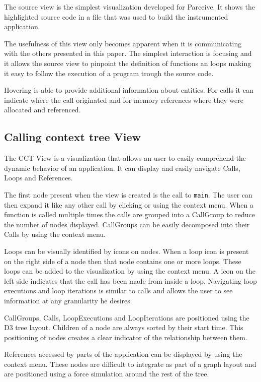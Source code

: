 \documentclass[conference]{IEEEtran}
\begin{document}
The source view is the simplest visualization developed for Parceive. It shows the highlighted source code in a file that was used to build the instrumented application.

The usefulness of this view only becomes apparent when it is communicating with the others presented in this paper. The simplest interaction is focusing and it allows the source view to pinpoint the definition of functions an loops making it easy to follow the execution of a program trough the source code.

Hovering is able to provide additional information about entities. For calls it can indicate where the call originated and for memory references where they were allocated and referenced.

\subsection{Calling context tree View}

The CCT View is a visualization that allows an user to easily comprehend the dynamic behavior of an application. It can display and easily navigate Calls, Loops and References.

The first node present when the view is created is the call to \texttt{main}. The user can then expand it like any other call by clicking or using the context menu. When a function is called multiple times the calls are grouped into a CallGroup to reduce the number of nodes displayed. CallGroups can be easily decomposed into their Calls by using the context menu.

Loops can be visually identified by icons on nodes. When a loop icon is present on the right side of a node then that node contains one or more loops. These loops can be added to the visualization by using the context menu. A icon on the left side indicates that the call has been made from inside a loop. Navigating loop executions and loop iterations is similar to calls and allows the user to see information at any granularity he desires.

CallGroups, Calls, LoopExecutions and LoopIterations are positioned using the D3 tree layout. Children of a node are always sorted by their start time. This positioning of nodes creates a clear indicator of the relationship between them.

References accessed by parts of the application can be displayed by using the context menu. These nodes are difficult to integrate as part of a graph layout and are positioned using a force simulation around the rest of the tree.
\end{document}

